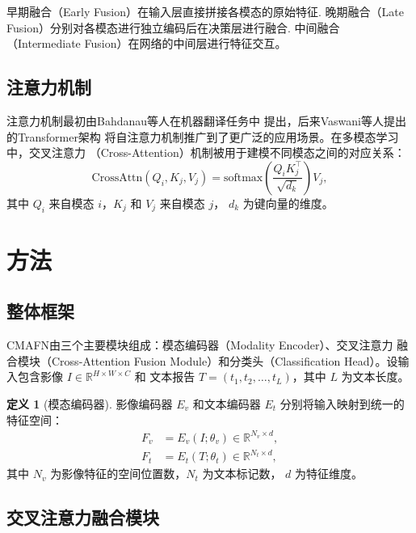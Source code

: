 \documentclass[12pt,a4paper]{article}
\theoremstyle{definition}
\newtheorem{definition}{定义}[section]
\begin{document}
早期融合（Early Fusion）在输入层直接拼接各模态的原始特征.
晚期融合（Late Fusion）分别对各模态进行独立编码后在决策层进行融合.
中间融合（Intermediate Fusion）在网络的中间层进行特征交互。

\subsection{注意力机制}

注意力机制最初由Bahdanau等人\cite{bahdanau2015neural}在机器翻译任务中
提出，后来Vaswani等人\cite{vaswani2017attention}提出的Transformer架构
将自注意力机制推广到了更广泛的应用场景。在多模态学习中，交叉注意力
（Cross-Attention）机制被用于建模不同模态之间的对应关系：
\begin{equation}\label{eq:cross-attn}
  \text{CrossAttn}(Q_i, K_j, V_j) =
    \text{softmax}\!\left(\frac{Q_i K_j^\top}{\sqrt{d_k}}\right) V_j,
\end{equation}
其中 $Q_i$ 来自模态 $i$，$K_j$ 和 $V_j$ 来自模态 $j$，
$d_k$ 为键向量的维度。


\section{方法}

\subsection{整体框架}

CMAFN由三个主要模块组成：模态编码器（Modality Encoder）、交叉注意力
融合模块（Cross-Attention Fusion Module）和分类头（Classification
Head）。设输入包含影像 $I \in \mathbb{R}^{H \times W \times C}$ 和
文本报告 $T = (t_1, t_2, \ldots, t_L)$，其中 $L$ 为文本长度。

\begin{definition}[模态编码器]
影像编码器 $E_v$ 和文本编码器 $E_t$ 分别将输入映射到统一的特征空间：
\begin{align}
  F_v &= E_v(I; \theta_v) \in \mathbb{R}^{N_v \times d}, \label{eq:vis-enc} \\
  F_t &= E_t(T; \theta_t) \in \mathbb{R}^{N_t \times d}, \label{eq:txt-enc}
\end{align}
其中 $N_v$ 为影像特征的空间位置数，$N_t$ 为文本标记数，
$d$ 为特征维度。
\end{definition}

\subsection{交叉注意力融合模块}
\end{document}
